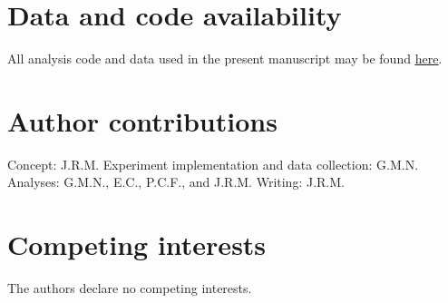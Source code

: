 \documentclass[10pt]{article}
\begin{document}
\section*{Data and code availability}
All analysis code and data used in the present manuscript may be found \href{https://github.com/ContextLab/brainfit-paper}{\underline{here}}.

\section*{Author contributions}
Concept: J.R.M.  Experiment implementation and data collection: G.M.N.
Analyses: G.M.N., E.C., P.C.F., and J.R.M.  Writing: J.R.M.

\section*{Competing interests}
The authors declare no competing interests.



\end{document}
